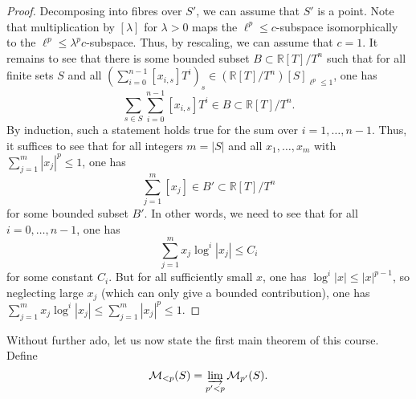 \documentclass[11pt]{amsbook}
\numberwithin{equation}{section}
\numberwithin{theorem}{section}
\theoremstyle{definition}
\begin{document}
\begin{proof} Decomposing into fibres over $S'$, we can assume that $S'$ is a point. Note that multiplication by $[\lambda]$ for $\lambda>0$ maps the $\ell^p\leq c$-subspace isomorphically to the $\ell^p\leq \lambda^p c$-subspace. Thus, by rescaling, we can assume that $c=1$. It remains to see that there is some bounded subset $B\subset \mathbb R[T]/T^n$ such that for all finite sets $S$ and all $(\sum_{i=0}^{n-1} [x_{i,s}]T^i)_s\in (\mathbb R[T]/T^n)[S]_{\ell^p\leq 1}$, one has
\[
\sum_{s\in S} \sum_{i=0}^{n-1} [x_{i,s}]T^i\in B\subset \mathbb R[T]/T^n.
\]
By induction, such a statement holds true for the sum over $i=1,\ldots,n-1$. Thus, it suffices to see that for all integers $m=|S|$ and all $x_1,\ldots,x_m$ with $\sum_{j=1}^m |x_j|^p\leq 1$, one has
\[
\sum_{j=1}^m [x_j]\in B'\subset \mathbb R[T]/T^n
\]
for some bounded subset $B'$. In other words, we need to see that for all $i=0,\ldots,n-1$, one has
\[
\sum_{j=1}^m x_j\log^i|x_j|\leq C_i
\]
for some constant $C_i$. But for all sufficiently small $x$, one has $\log^i |x|\leq |x|^{p-1}$, so neglecting large $x_j$ (which can only give a bounded contribution), one has $\sum_{j=1}^m x_j\log^i|x_j|\leq \sum_{j=1}^m |x_j|^p\leq 1$.
\end{proof}

Without further ado, let us now state the first main theorem of this course. Define
\[
\mathcal M_{<p}(S) = \varinjlim_{p'<p} \mathcal M_{p'}(S).
\]
\end{document}
